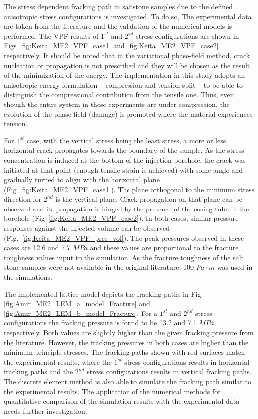  The stress dependent fracking path in saltstone samples due to the defined anisotropic stress configurations is investigated. To do so,  The experimental data are taken from the literature and the validation of the numerical models is performed. 
 The VPF results of  $1^{st}$ and $2^{nd}$ stress configurations are shown in Figs~\ref{fig:Keita_ME2_VPF_case1} and~\ref{fig:Keita_ME2_VPF_case2} respectively.
 It should be noted that in the variational phase-field method, crack nucleation or propagation is not prescribed and they will be chosen as the result of the minimization of the energy.
 The implementation in this study adopts an anisotropic energy formulation -- compression and tension split -- to be able to distinguish the compressional contribution from the tensile one.
 Thus, even though the entire system in these experiments are under compression, the evolution of the phase-field (damage) is promoted where the material experiences tension.
 
 For $1^{st}$ case, with the vertical stress being the least stress, a more or less horizontal crack propagates towards the boundary of the sample.
 As the stress concentration is induced at the bottom of the injection borehole, the crack was initiated at that point (enough tensile strain is achieved) with some angle and gradually turned to align with the horizontal plane (Fig~\ref{fig:Keita_ME2_VPF_case1}).
 The plane orthogonal to the minimum stress direction for $2^{nd}$ is the vertical plane.
 Crack propagation on that plane can be observed and its propagation is hinged by the presence of the casing tube in the borehole (Fig~\ref{fig:Keita_ME2_VPF_case2}).
 In both cases, similar pressure responses against the injected volume can be observed (Fig.~\ref{fig:Keita_ME2_VPF_pres_vol}). 
 The peak pressures observed in these cases are 12.6 and 7.7 $MPa$ and these values are proportional to the fracture toughness values input to the simulation.
 As the fracture toughness of the salt stone samples were not available in the original literature, 100 $Pa \cdot m$ was used in the simulations. 
 
 The implemented lattice model depicts the fracking paths in Fig.  \ref{fig:Amir_ME2_LEM_a_model_Fracture} and \ref{fig:Amir_ME2_LEM_b_model_Fracture}. For a $1^{st}$ and $2^{nd}$ stress configurations the fracking pressure is found to be 13.2 and 7.1 $MPa$, respectively. Both values are slightly higher than the given fracking pressure from the literature. However, the fracking pressures in both cases are higher than the minimum principle stresses. The fracking paths shown with red surfaces match the experimental results, where the $1^{st}$ stress configurations results in horizontal fracking paths and the $2^{nd}$ stress configurations results in vertical fracking paths. The discrete element method is also able to simulate the fracking path similar to the experimental results. The application of the numerical methods for quantitative comparison of the simulation results with the experimental data needs further investigation. 


